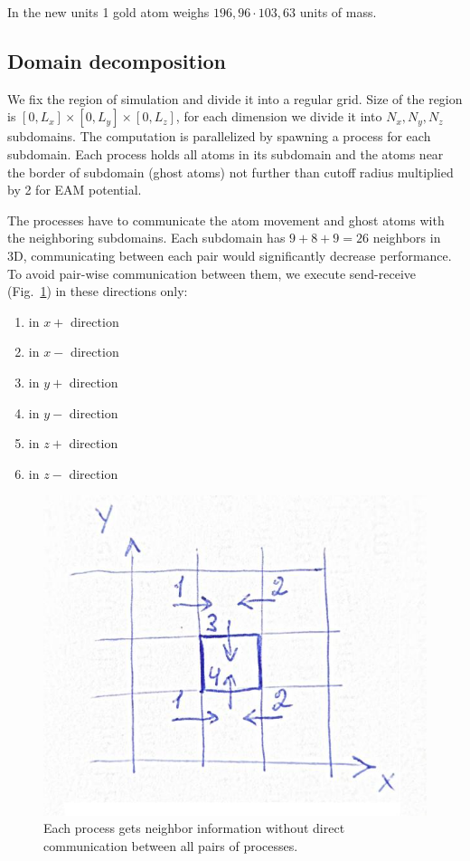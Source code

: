 \documentclass[12pt,a4paper]{article}
\begin{document}
In the new units 1 gold atom weighs $196,96 \cdot 103,63$ units of mass.

\clearpage

\subsection*{Domain decomposition}

We fix the region of simulation and divide it into a regular grid. Size of the region is $[0, L_x] \times [0, L_y] \times [0, L_z]$, for each dimension we divide it into $N_x, N_y, N_z$ subdomains. The computation is parallelized by spawning a process for each subdomain. Each process holds all atoms in its subdomain and the atoms near the border of subdomain (ghost atoms) not further than cutoff radius multiplied by 2 for EAM potential.

The processes have to communicate the atom movement and ghost atoms with the neighboring subdomains. Each subdomain has $9+8+9=26$ neighbors in 3D, communicating between each pair would significantly decrease performance. To avoid pair-wise communication between them, we execute send-receive (Fig.~\ref{fig:domain-communication}) in these directions only:

\begin{enumerate}
	\item in $x+$ direction
	\item in $x-$ direction
	\item in $y+$ direction
	\item in $y-$ direction
	\item in $z+$ direction
	\item in $z-$ direction
\end{enumerate}

\begin{figure}[h!]
	\centering
	\includegraphics[width=.5\linewidth]{img/milestone08-domain-communication.jpg}
	\caption{Each process gets neighbor information without direct communication between all pairs of processes.}
	\label{fig:domain-communication}
\end{figure}
\end{document}
